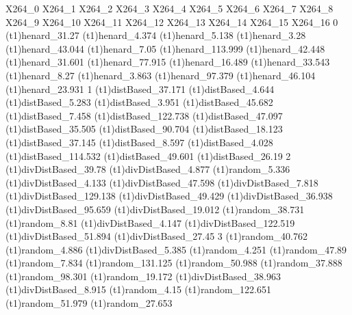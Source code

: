 X264_0	X264_1	X264_2	X264_3	X264_4	X264_5	X264_6	X264_7	X264_8	X264_9	X264_10	X264_11	X264_12	X264_13	X264_14	X264_15	X264_16
0	(t1)henard_31.27	(t1)henard_4.374	(t1)henard_5.138	(t1)henard_3.28	(t1)henard_43.044	(t1)henard_7.05	(t1)henard_113.999	(t1)henard_42.448	(t1)henard_31.601	(t1)henard_77.915	(t1)henard_16.489	(t1)henard_33.543	(t1)henard_8.27	(t1)henard_3.863	(t1)henard_97.379	(t1)henard_46.104	(t1)henard_23.931
1	(t1)distBased_37.171	(t1)distBased_4.644	(t1)distBased_5.283	(t1)distBased_3.951	(t1)distBased_45.682	(t1)distBased_7.458	(t1)distBased_122.738	(t1)distBased_47.097	(t1)distBased_35.505	(t1)distBased_90.704	(t1)distBased_18.123	(t1)distBased_37.145	(t1)distBased_8.597	(t1)distBased_4.028	(t1)distBased_114.532	(t1)distBased_49.601	(t1)distBased_26.19
2	(t1)divDistBased_39.78	(t1)divDistBased_4.877	(t1)random_5.336	(t1)divDistBased_4.133	(t1)divDistBased_47.598	(t1)divDistBased_7.818	(t1)divDistBased_129.138	(t1)divDistBased_49.429	(t1)divDistBased_36.938	(t1)divDistBased_95.659	(t1)divDistBased_19.012	(t1)random_38.731	(t1)random_8.81	(t1)divDistBased_4.147	(t1)divDistBased_122.519	(t1)divDistBased_51.894	(t1)divDistBased_27.45
3	(t1)random_40.762	(t1)random_4.886	(t1)divDistBased_5.385	(t1)random_4.251	(t1)random_47.89	(t1)random_7.834	(t1)random_131.125	(t1)random_50.988	(t1)random_37.888	(t1)random_98.301	(t1)random_19.172	(t1)divDistBased_38.963	(t1)divDistBased_8.915	(t1)random_4.15	(t1)random_122.651	(t1)random_51.979	(t1)random_27.653